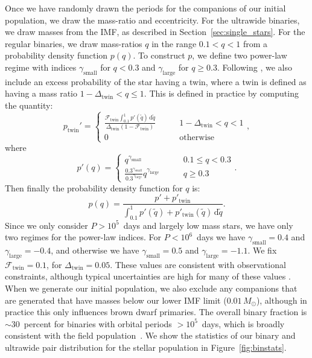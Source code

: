 \documentclass{aa}
\begin{document}
Once we have randomly drawn the periods for the companions of our initial population, we draw the mass-ratio and eccentricity. For the ultrawide binaries, we draw masses from the IMF, as described in Section~\ref{sec:single_stars}. For the regular binaries, we draw mass-ratios $q$ in the range $0.1< q < 1$ from a probability density function $p(q)$. To construct $p$, we define two power-law regime with indices $\gamma_{\mathrm{small}}$ for $q<0.3$ and $\gamma_{\mathrm{large}}$ for $q\geq0.3$. Following \citet{Moe17}, we also include an excess probability of the star having a twin, where a twin is defined as having a mass ratio $1- \Delta_\mathrm{twin}< q \leq 1$. This is defined in practice by computing the quantity: 
\begin{equation}
    p_\mathrm{twin}' = \begin{cases} \frac{\mathcal{F}_\mathrm{twin} \int_{0.1} ^1 p' (\tilde{q}) \, \mathrm{d} \tilde{q}}{\Delta_\mathrm{twin} (1- \mathcal{F}_\mathrm{twin} ) } &\qquad 1-\Delta_\mathrm{twin} < q < 1 \\
    0 & \qquad \mathrm{otherwise}
    \end{cases},
\end{equation}where
\begin{equation}
    p' (q) = \begin{cases}
        q^{\gamma_{\mathrm{small}}} & \qquad 0.1\leq  q<0.3 \\
        \frac{0.3^{\gamma_{\mathrm{small}}}}{ 0.3^{\gamma_{\mathrm{large}}}} q^{\gamma_{\mathrm{large}}} & \qquad q\geq 0.3
    \end{cases}.
\end{equation}Then finally the probability density function for $q$ is:  
\begin{equation}
    p(q) = \frac{p' +p'_\mathrm{twin}}{\int_{0.1}^1 p'(\tilde{q}) +p'_\mathrm{twin}(\tilde{q}) \, \mathrm{d}\tilde{q} }.
\end{equation}Since we only consider $P > 10^{5}$~days and largely low mass stars, we have only two regimes for the power-law indices. For $P< 10^6$~days we have $\gamma_{\mathrm{small}} = 0.4$ and $\gamma_{\mathrm{large}} = -0.4$, and otherwise we have $\gamma_{\mathrm{small}} = 0.5$ and $\gamma_{\mathrm{large}} = -1.1$. We fix $\mathcal{F}_\mathrm{twin} = 0.1$, for $
\Delta_\mathrm{twin} = 0.05$. These values are consistent with observational constraints, although typical uncertainties are high for many of these values \citep{ElBadry19}. When we generate our initial population, we also exclude any companions that are generated that have masses below our lower IMF limit ($0.01 \, M_\odot$), although in practice this only influences brown dwarf primaries. The overall binary fraction is $\sim 30$~percent for binaries with orbital periods $>10^5$~days, which is broadly consistent with the field population~\citep[e.g.][]{Niu21}. {We show the statistics of our binary and ultrawide pair distribution for the stellar population in Figure~\ref{fig:binstats}.}
\end{document}

